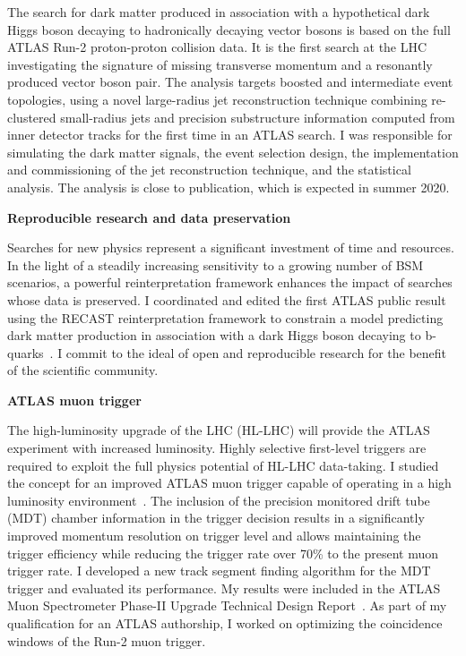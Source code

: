 \documentclass{article}
\begin{document}
\medskip

The search for dark matter produced in association with a hypothetical dark Higgs boson decaying to hadronically decaying vector bosons is based on the full ATLAS Run-2 proton-proton collision data. It is the first search at the LHC investigating the signature of missing transverse momentum and a resonantly produced vector boson pair. The analysis targets boosted and intermediate event topologies, using a novel large-radius jet reconstruction technique combining re-clustered small-radius jets and precision substructure information computed from inner detector tracks for the first time in an ATLAS search. I was responsible for simulating the dark matter signals, the event selection design, the implementation and commissioning of the jet reconstruction technique, and the statistical analysis. The analysis is close to publication, which is expected in summer 2020.


\bigskip
{\bf Reproducible research and data preservation}
\medskip

Searches for new physics represent a significant investment of time and resources. In the light of a steadily increasing sensitivity to a growing number of BSM scenarios, a powerful reinterpretation framework enhances the impact of searches whose data is preserved. I coordinated and edited the first ATLAS public result using the RECAST reinterpretation framework to constrain a model predicting dark matter production in association with a dark Higgs boson decaying to b-quarks~\cite{ATL-PHYS-PUB-2019-032}. I commit to the ideal of open and reproducible research for the benefit of the scientific community.

\bigskip
{\bf ATLAS muon trigger}
\medskip

The high-luminosity upgrade of the LHC (HL-LHC) will provide the ATLAS experiment with increased luminosity. Highly selective first-level triggers are required to exploit the full physics potential of HL-LHC data-taking. I studied the concept for an improved ATLAS muon trigger capable of operating in a high luminosity environment~\cite{Gadow}. The inclusion of the precision monitored drift tube (MDT) chamber information in the trigger decision results in a significantly improved momentum resolution on trigger level and allows maintaining the trigger efficiency while reducing the trigger rate over 70\% to the present muon trigger rate.
I developed a new track segment finding algorithm for the MDT trigger and evaluated its performance. My results were included in the ATLAS Muon Spectrometer Phase-II Upgrade Technical Design Report~\cite{ATLAS-TDR-26}.
As part of my qualification for an ATLAS authorship, I worked on optimizing the coincidence windows of the Run-2 muon trigger.
\end{document}
